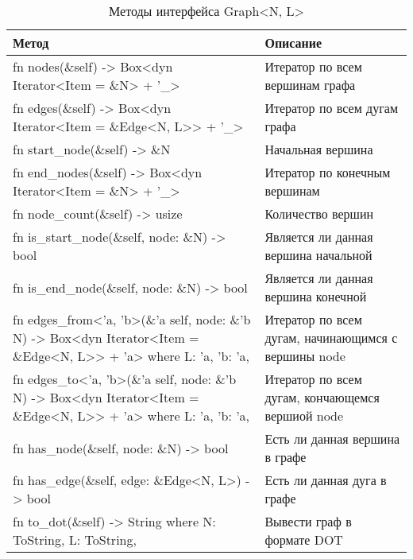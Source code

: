 \begin{table}
    \caption{Методы интерфейса Graph<N, L>}
    \label{class_GraphNL_api}
    \begin{tabular}{|m{20em}|m{20em}|}
        \hline
        \textbf{Метод} & \textbf{Описание}\\
        \hline
            fn nodes(\&self) -> Box<dyn Iterator<Item = \&N> + '\_> & Итератор по всем вершинам графа \\
        \hline
            fn edges(\&self) -> Box<dyn Iterator<Item = \&Edge<N, L>{}> + '\_> & Итератор по всем дугам графа \\
        \hline
            fn start\_node(\&self) -> \&N & Начальная вершина \\
        \hline
            fn end\_nodes(\&self) -> Box<dyn Iterator<Item = \&N> + '\_> & Итератор по конечным вершинам \\
        \hline
            fn node\_count(\&self) -> usize & Количество вершин \\
        \hline
            fn is\_start\_node(\&self, node: \&N) -> bool & Является ли данная вершина начальной \\
        \hline
            fn is\_end\_node(\&self, node: \&N) -> bool & Является ли данная вершина конечной \\
        \hline
            fn edges\_from<'a, 'b>(\&'a self, node: \&'b N) -> Box<dyn Iterator<Item = \&Edge<N, L>{}> + 'a> \newline 
            where L: 'a, 'b: 'a, & Итератор по всем дугам, начинающимся с вершины node \\
        \hline
            fn edges\_to<'a, 'b>(\&'a self, node: \&'b N) -> Box<dyn Iterator<Item = \&Edge<N, L>{}> + 'a> \newline 
            where L: 'a, 'b: 'a, & Итератор по всем дугам, кончающемся вершиой node\\
        \hline
            fn has\_node(\&self, node: \&N) -> bool & Есть ли данная вершина в графе \\
        \hline
            fn has\_edge(\&self, edge: \&Edge<N, L>) -> bool & Есть ли данная дуга в графе \\
        \hline
            fn to\_dot(\&self) -> String \newline where N: ToString, L: ToString, & Вывести граф в формате DOT \\
        \hline
    \end{tabular}
\end{table}

